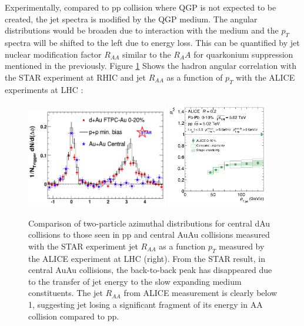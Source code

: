 Experimentally, compared to pp collision where QGP is not expected to be created, the jet spectra is modified by the QGP medium. The angular distributions would be broaden due to interaction with the medium and the $p_T$ spectra will be shifted to the left due to energy loss. This can be quantified by jet nuclear modification factor $R_{AA}$ similar to the $R_AA$ for quarkonium suppression mentioned in the previously. Figure \ref{JetRAA} Shows the hadron angular correlation with the STAR experiment at RHIC and jet $R_{AA}$ as a function of $p_T$ with the ALICE experiments at LHC \cite{STARJetRef,ALICEJetRef}:
  
\begin{figure}[hbtp]
\begin{center}
\includegraphics[width=0.55\textwidth]{Figures/Chapter1/HadronAngularSTAR.png}
\includegraphics[width=0.40\textwidth]{Figures/Chapter1/JetRAAALICE.png}
\caption{Comparison of two-particle azimuthal distributions for central dAu collisions to those seen in pp and central AuAu collisions measured with the STAR experiment jet $R_{AA}$ as a function $p_T$ measured by the ALICE experiment at LHC (right). From the STAR result, in central AuAu collisions, the back-to-back peak has disappeared due to the transfer of jet energy to the slow expanding medium constituents. The jet $R_{AA}$ from ALICE measurement is clearly below 1, suggesting jet losing a significant fragment of its energy in AA collision compared to pp.}
\label{JetRAA}
\end{center}
\end{figure} 


